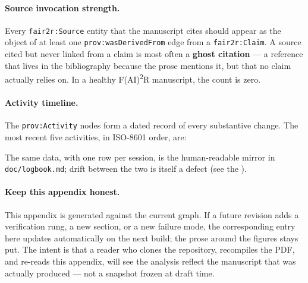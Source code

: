 \paragraph{Source invocation strength.}
Every \texttt{fair2r:Source} entity that the manuscript cites should
appear as the object of at least one
\texttt{prov:wasDerivedFrom} edge from a \texttt{fair2r:Claim}. A
source cited but never linked from a claim is most often a
\textbf{ghost citation} --- a reference that lives in the
bibliography because the prose mentions it, but that no claim
actually relies on. In a healthy F(AI)\textsuperscript{2}R
manuscript, the count is zero.



\paragraph{Activity timeline.}
The \texttt{prov:Activity} nodes form a dated record of every
substantive change. The most recent five activities, in
ISO-8601 order, are:



\noindent The same data, with one row per session, is the
human-readable mirror in \texttt{doc/logbook.md}; drift between the
two is itself a defect (see the ).

\paragraph{Keep this appendix honest.}
This appendix is generated against the current graph. If a future
revision adds a verification rung, a new section, or a new failure
mode, the corresponding entry here updates automatically on the next
build; the prose around the figures stays put. The intent is that a
reader who clones the repository, recompiles the PDF, and re-reads
this appendix, will see the analysis reflect the manuscript that was
actually produced --- not a snapshot frozen at draft time.
